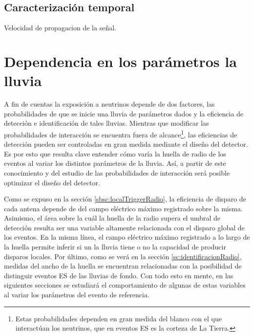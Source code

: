 	
% 		
% 	
% 	
% 	
% 	
% 		
	
	\subsection{Caracterizaci\'on temporal}
	
	Velocidad de propagacion de la se\~nal.
	
	\section{Dependencia en los par\'ametros la lluvia}
	
	A fin de cuentas la exposici\'on a neutrinos depende de dos factores, las probabilidades de que se inicie una lluvia de par\'ametros dados y la eficiencia de detecci\'on e identificaci\'on de tales lluvias.
	Mientras que modificar las probabilidades de interacci\'on se encuentra fuera de alcance\footnote{Estas probabilidades dependen en gran medida del blanco con el que interact\'uan los neutrinos, que en eventos ES es la corteza de La Tierra.}, las eficiencias de detecci\'on pueden ser controladas en gran medida mediante el dise\~no del detector. 
	Es por esto que resulta clave entender c\'omo var\'ia la huella de radio de los eventos al variar los distintos par\'ametros de la lluvia.
	As\'i, a partir de este conocimiento y del estudio de las probabilidades de interacci\'on ser\'a posible optimizar el dise\~no del detector.
	
	Como se expuso en la secci\'on \ref{sbsc:localTriggerRadio}, la eficiencia de disparo de cada antena depende de del campo el\'ectrico m\'aximo registrado sobre la misma.
	Asimismo, el \'area sobre la cu\'al la huella de la radio supera el umbral de detecci\'on resulta ser una variable altamente relacionada con el disparo global de los eventos.
	En la misma l\'inea, el campo el\'ectrico m\'aximo registrado a lo largo de la huella permite inferir si un la lluvia tiene o no la capacidad de producir disparos locales.
	Por \'ultimo, como se ver\'a en la secci\'on \ref{sc:identificacionRadio}, medidas del ancho de la huella se encuentran relacionadas con la posibilidad de distinguir eventos ES de las lluvias de fondo.
	Con todo esto en mente, en las siguientes secciones se estudiar\'a el comportamiento de algunas de estas variables al variar los par\'ametros del evento de referencia.
	
